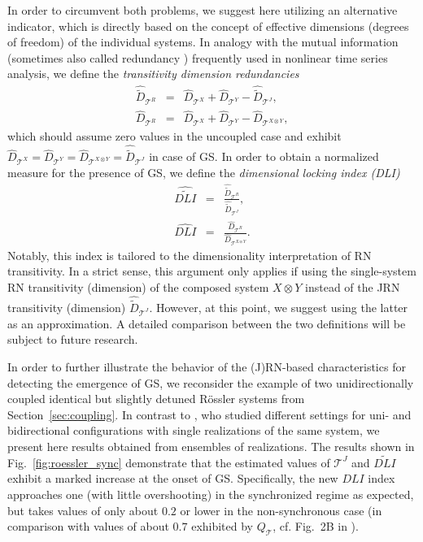 In order to circumvent both problems, we suggest here utilizing an alternative indicator, which is directly based on the concept of effective dimensions (degrees of freedom) of the individual systems. In analogy with the mutual information (sometimes also called redundancy \cite{Palus1995,Prichard1995}) frequently used in nonlinear time series analysis, we define the \emph{transitivity dimension redundancies}
\begin{eqnarray}
\hat{\tilde{D}}_{\mathcal{T}^R}&=&\hat{D}_{\mathcal{T}^X}+\hat{D}_{\mathcal{T}^Y}-\hat{\tilde{D}}_{\mathcal{T}^J}, \\
\hat{D}_{\mathcal{T}^R}&=&\hat{D}_{\mathcal{T}^X}+\hat{D}_{\mathcal{T}^Y}-\hat{D}_{\mathcal{T}^{X\otimes Y}},
\end{eqnarray}
\noindent
which should assume zero values in the uncoupled case and exhibit $\hat{D}_{\mathcal{T}^X}=\hat{D}_{\mathcal{T}^Y}=\hat{D}_{\mathcal{T}^{X\otimes Y}}=\hat{\tilde{D}}_{\mathcal{T}^J}$ in case of GS. In order to obtain a normalized measure for the presence of GS, we define the \emph{dimensional locking index (DLI)}
\begin{eqnarray}
\widehat{\widetilde{DLI}} &=& \frac{\hat{\tilde{D}}_{\mathcal{T}^R}}{\hat{\tilde{D}}_{\mathcal{T}^J}}, \\
\widehat{DLI} &=& \frac{\hat{D}_{\mathcal{T}^R}}{\hat{D}_{\mathcal{T}^{X\otimes Y}}}.
\end{eqnarray}
\noindent
Notably, this index is tailored to the dimensionality interpretation of RN transitivity. In a strict sense, this argument only applies if using the single-system RN transitivity (dimension) of the composed system $X\otimes Y$ instead of the JRN transitivity (dimension) $\hat{\tilde{D}}_{\mathcal{T}^J}$. However, at this point, we suggest using the latter as an approximation. A detailed comparison between the two definitions will be subject to future research.

In order to further illustrate the behavior of the (J)RN-based characteristics for detecting the emergence of GS, we reconsider the example of two unidirectionally coupled identical but slightly detuned R\"ossler systems from Section~\ref{sec:coupling}. In contrast to \cite{Feldhoff2013}, who studied different settings for uni- and bidirectional configurations with single realizations of the same system, we present here results obtained from ensembles of realizations. The results shown in Fig.~\ref{fig:roessler_sync} demonstrate that the estimated values of $\mathcal{T}^J$ and $\widetilde{DLI}$ exhibit a marked increase at the onset of GS. Specifically, the new $DLI$ index approaches one (with little overshooting) in the synchronized regime as expected, but takes values of only about $0.2$ or lower in the non-synchronous case (in comparison with values of about $0.7$ exhibited by $Q_{\mathcal{T}}$, cf. Fig.~2B in \cite{Feldhoff2013}). 

